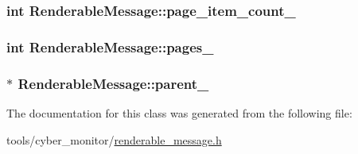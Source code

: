 \hypertarget{classRenderableMessage_ac013cc75fdc393be5bf3c8e95d1b5430}{
\subsubsection[{page\-\_\-item\-\_\-count\-\_\-}]{\setlength{\rightskip}{0pt plus 5cm}int Renderable\-Message\-::page\-\_\-item\-\_\-count\-\_\-\hspace{0.3cm}{\ttfamily [protected]}}}\label{classRenderableMessage_ac013cc75fdc393be5bf3c8e95d1b5430}
\hypertarget{classRenderableMessage_ac3a01804a7e180672c2a34fe2b8b0a8c}{
\subsubsection[{pages\-\_\-}]{\setlength{\rightskip}{0pt plus 5cm}int Renderable\-Message\-::pages\-\_\-\hspace{0.3cm}{\ttfamily [protected]}}}\label{classRenderableMessage_ac3a01804a7e180672c2a34fe2b8b0a8c}
\hypertarget{classRenderableMessage_a4745527c9b4cf149bfeccee669fd3aa8}{
\subsubsection[{parent\-\_\-}]{$\ast$ Renderable\-Message\-::parent\-\_\-\hspace{0.3cm}{\ttfamily [protected]}}}\label{classRenderableMessage_a4745527c9b4cf149bfeccee669fd3aa8}


The documentation for this class was generated from the following file\-:\begin{DoxyCompactItemize}
\item 
tools/cyber\-\_\-monitor/\hyperlink{renderable__message_8h}{renderable\-\_\-message.\-h}\end{DoxyCompactItemize}
